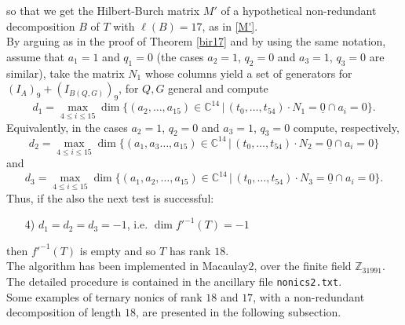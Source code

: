 \documentclass{amsart}
\newcommand{\C}{\mathbb{C}}
\newcommand{\Z}{\mathbb{Z}}
\theoremstyle{definition}
\newcommand{\luca}[1]{{\color{orange}#1}}
\begin{document}
so that we get the Hilbert-Burch matrix $ M' $ of a hypothetical non-redundant decomposition $ B $ of $ T $ with $ \ell(B) = 17 $, as in \eqref{M'}. \\ By arguing as in the proof of Theorem \ref{bir17} and by using the same notation, assume that $ a_{1} = 1 $ and $ q_{1} = 0 $ (the cases $ a_{2} = 1 $, $ q_{2} = 0 $ and $ a_{3} = 1 $, $ q_{3} = 0 $ are similar), take the matrix $ N_{1} $ whose columns yield a set of generators for $ (I_{A})_{9} + (I_{B(Q,G)})_{9} $, for $ Q, G $ general and compute 
$$ d_{1} = \max_{4 \leq i \leq 15} \dim \{(a_{2}, \ldots, a_{15}) \in \C^{14} \, | \, (t_{0}, \ldots, t_{54}) \cdot N_{1} = \underline{0} \cap a_{i} = 0 \}. $$
 Equivalently, in the cases $ a_{2} = 1 $, $ q_{2} = 0 $ and $ a_{3} = 1 $, $ q_{3} = 0 $ compute, respectively, 
$$ d_{2} = \max_{4 \leq i \leq 15} \dim \{(a_{1},a_{3} \ldots, a_{15}) \in \C^{14} \, | \, (t_{0}, \ldots, t_{54}) \cdot N_{2} = \underline{0} \cap a_{i} = 0 \} $$
and
$$ d_{3} = \max_{4 \leq i \leq 15} \dim \{(a_{1},a_{2}, \ldots, a_{15}) \in \C^{14} \, | \, (t_{0}, \ldots, t_{54}) \cdot N_{3} = \underline{0} \cap a_{i} = 0 \}. $$
Thus, if the also the next test is successful:
\begin{enumerate}
\item[4)] $ d_{1} = d_{2} = d_{3} = - 1 $, i.e. $ \dim f'^{-1}(T) = -1 $
\end{enumerate}
then $ f'^{-1}(T) $ is empty and so $ T $ has rank $ 18 $.\\


The algorithm has been implemented in Macaulay2, over the finite field $ \Z_{31991} $. The detailed procedure is contained in the ancillary file \texttt{nonics2.txt}. \\

Some examples of %
ternary nonics of rank $ 18 $ and $ 17 $, with a non-redundant decomposition of length $18$, are presented in the following subsection.
\end{document}
